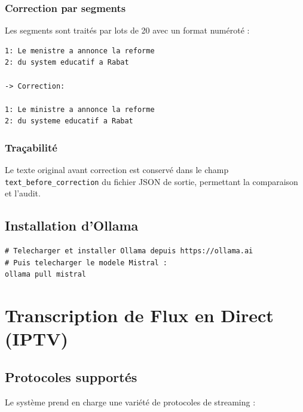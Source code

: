 \documentclass[12pt,a4paper]{report}
\begin{document}
\subsection{Correction par segments}

Les segments sont traités par lots de 20 avec un format numéroté :

\begin{lstlisting}[title=Format d'entrée/sortie de la correction par segments]
1: Le menistre a annonce la reforme
2: du system educatif a Rabat

-> Correction:

1: Le ministre a annonce la reforme
2: du systeme educatif a Rabat
\end{lstlisting}

\subsection{Traçabilité}

Le texte original avant correction est conservé dans le champ \texttt{text\_before\_correction} du fichier JSON de sortie, permettant la comparaison et l'audit.

\section{Installation d'Ollama}

\begin{lstlisting}[style=bash, title=Installation et configuration d'Ollama]
# Telecharger et installer Ollama depuis https://ollama.ai
# Puis telecharger le modele Mistral :
ollama pull mistral
\end{lstlisting}

\chapter{Transcription de Flux en Direct (IPTV)}

\section{Protocoles supportés}

Le système prend en charge une variété de protocoles de streaming :
\end{document}
